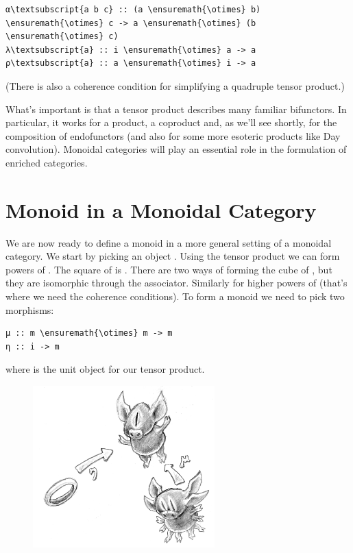 \begin{Verbatim}[commandchars=\\\{\}]
α\textsubscript{a b c} :: (a \ensuremath{\otimes} b) \ensuremath{\otimes} c -> a \ensuremath{\otimes} (b \ensuremath{\otimes} c)
λ\textsubscript{a} :: i \ensuremath{\otimes} a -> a
ρ\textsubscript{a} :: a \ensuremath{\otimes} i -> a
\end{Verbatim}
(There is also a coherence condition for simplifying a quadruple tensor
product.)

What's important is that a tensor product describes many familiar
bifunctors. In particular, it works for a product, a coproduct and, as
we'll see shortly, for the composition of endofunctors (and also for
some more esoteric products like Day convolution). Monoidal categories
will play an essential role in the formulation of enriched categories.

\section{Monoid in a Monoidal
Category}\label{monoid-in-a-monoidal-category}

We are now ready to define a monoid in a more general setting of a
monoidal category. We start by picking an object . Using the
tensor product we can form powers of . The square of
 is . There are two ways of forming the cube
of , but they are isomorphic through the associator. Similarly
for higher powers of  (that's where we need the coherence
conditions). To form a monoid we need to pick two morphisms:

\begin{Verbatim}[commandchars=\\\{\}]
μ :: m \ensuremath{\otimes} m -> m
η :: i -> m
\end{Verbatim}
where  is the unit object for our tensor product.

\begin{figure}[H]
\centering
\includegraphics[width=70mm]{images/monoid-1.jpg}
\end{figure}

